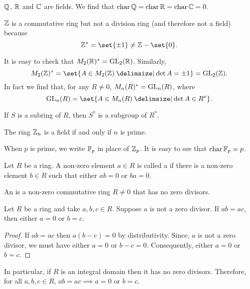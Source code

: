 \documentclass[11pt]{penrose}
\DeclareMathOperator{\charac}{char}
\begin{document}
\begin{negg}
    $\mathbb{Q}$, $\mathbb{R}$ and $\mathbb{C}$ are fields. We find that $\charac \Q = \charac \R = \charac \C = 0$.

    $\mathbb{Z}$ is a commutative ring but not a division ring (and therefore not a field) because
    \begin{equation*}
        \Z^* = \set{\pm 1} \neq \Z - \set{0}.
    \end{equation*}
\end{negg}

\begin{negg}
    It is easy to check that $M_2 (\mathbb{R})^* = \mathrm{GL}_2 (\mathbb{R})$. Similarly,
    \begin{equation*}
        M_2 (\Z)^*
        = \set{A \in M_2 (\Z) \st \det A = \pm 1}
        = \GL_2 (\Z).
    \end{equation*}
    In fact we find that, for any $R \neq 0$, $M_n (R)^* = \mathrm{GL}_n (R)$, where
    \begin{equation*}
        \GL_n (R) = \set{A \in M_n (R) \st \det A \in R^*}.
    \end{equation*}
\end{negg}

\begin{nthm}
    If $S$ is a subring of $R$, then $S^*$ is a subgroup of $R^*$.
\end{nthm}

\begin{nthm}
    The ring $\mathbb{Z}_n$ is a field if and only if $n$ is prime.
\end{nthm}

\begin{remark}
    When $p$ is prime, we write $\mathbb{F}_p$ in place of $\mathbb{Z}_p$. It is easy to see that $\charac \F_p = p$.
\end{remark}

\begin{ndfn}
    Let $R$ be a ring. A non-zero element $a \in R$ is called a  if there is a non-zero element $b \in R$ such that either $ab = 0$ or $ba = 0$.
\end{ndfn}

\begin{ndfn}
    An  is a non-zero commutative ring $R \neq 0$ that has no zero divisors.
\end{ndfn}

\begin{nthm}
    Let $R$ be a ring and take $a, b, c \in R$. Suppose $a$ is not a zero divisor. If $ab = ac$, then either $a = 0$ or $b = c$.
\end{nthm}
\begin{proof}
    If $ab = ac$ then $a (b - c) = 0$ by distributivity. Since, $a$ is not a zero divisor, we must have either $a = 0$ or $b-c = 0$. Consequently, either $a = 0$ or $b = c$.
\end{proof}
\begin{remark}
    In particular, if $R$ is an integral domain then it has no zero divisors. Therefore, for all $a, b, c \in R$, $ab = ac \implies a = 0$ or $b = c$.
\end{remark}
\end{document}

